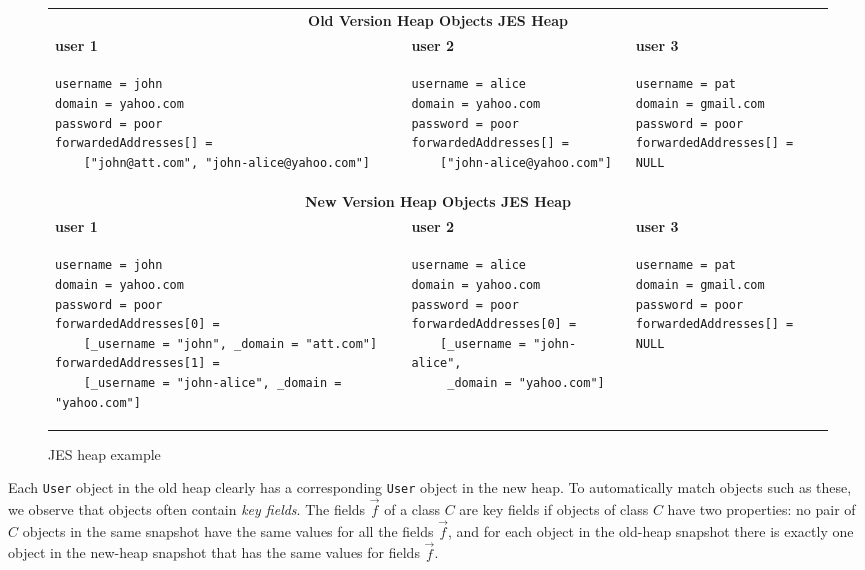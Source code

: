 \documentclass[natbib]{sigplanconf}
\newcommand{\code}[1]{\lstinline|#1|\xspace}
\begin{document}
\begin{figure}[t]
\begin{center}
\footnotesize{
\begin{tabular}{ p{2.7in} p{2in}  p{2in}} \\ \toprule
\multicolumn{3}{c}{\textsf{\textbf{Old Version Heap Objects JES Heap}}}\\
\textsf{\textbf{user 1}} & \textsf{\textbf{user 2}} & \textsf{\textbf{user 3}} \\[-1.75em]
\begin{lstlisting}
username = john
domain = yahoo.com
password = poor
forwardedAddresses[] = 
    ["john@att.com", "john-alice@yahoo.com"]
\end{lstlisting}
& 
\begin{lstlisting}
username = alice
domain = yahoo.com
password = poor
forwardedAddresses[] = 
    ["john-alice@yahoo.com"]
\end{lstlisting}
&
\begin{lstlisting}
username = pat
domain = gmail.com
password = poor
forwardedAddresses[] = NULL
\end{lstlisting} \\[-1.5em] \midrule
\multicolumn{3}{c}{\textsf{\textbf{New Version Heap Objects JES Heap}}}\\
\textsf{\textbf{user 1}} & \textsf{\textbf{user 2}} & \textsf{\textbf{user 3}} \\[-1.75em]
\begin{lstlisting}
username = john
domain = yahoo.com
password = poor
forwardedAddresses[0] = 
    [_username = "john", _domain = "att.com"]
forwardedAddresses[1] = 
    [_username = "john-alice", _domain = "yahoo.com"]
\end{lstlisting}
&
\begin{lstlisting}
username = alice
domain = yahoo.com
password = poor
forwardedAddresses[0] = 
    [_username = "john-alice", 
     _domain = "yahoo.com"]
\end{lstlisting}
&
\begin{lstlisting}
username = pat
domain = gmail.com
password = poor
forwardedAddresses[] = NULL
\end{lstlisting} \\[-3em]
\end{tabular}}
\end{center}
\caption{JES heap example}
\label{fig:JES-heap}
\end{figure}

Each \code{User} object in the old heap clearly has a corresponding
\code{User} object in the new heap.  To automatically match objects
such as these, we observe that objects often contain \emph{key
  fields}.  The fields $\vec{f}$ of a class $C$ are key fields if
objects of class $C$ have two properties: no pair of $C$ objects in
the same snapshot have the same values for all the fields $\vec{f}$,
and for each object in the old-heap snapshot there is exactly one
object in the new-heap snapshot that has the same values for fields
$\vec{f}$.
\end{document}
